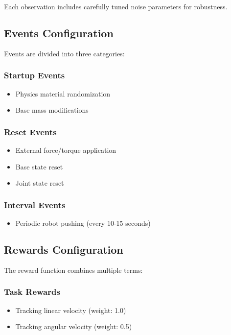 \documentclass{article}
\begin{document}
Each observation includes carefully tuned noise parameters for robustness.

\subsection{Events Configuration}
Events are divided into three categories:

\subsubsection{Startup Events}
\begin{itemize}
    \item Physics material randomization
    \item Base mass modifications
\end{itemize}

\subsubsection{Reset Events}
\begin{itemize}
    \item External force/torque application
    \item Base state reset
    \item Joint state reset
\end{itemize}

\subsubsection{Interval Events}
\begin{itemize}
    \item Periodic robot pushing (every 10-15 seconds)
\end{itemize}

\subsection{Rewards Configuration}
The reward function combines multiple terms:

\subsubsection{Task Rewards}
\begin{itemize}
    \item Tracking linear velocity (weight: 1.0)
    \item Tracking angular velocity (weight: 0.5)
\end{itemize}
\end{document}
